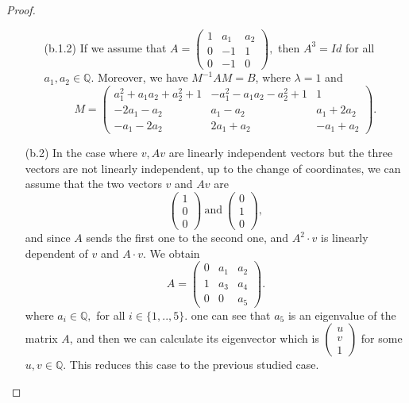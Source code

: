\documentclass[10pt,a4paper]{amsart}
\newcommand{\Q}{\ensuremath{\mathbb{Q} }}
\begin{document}
\begin{proof}
\begin{itemize}
\begin{itemize}
\item [(b.1.2)] If we assume that
$A=\left(\begin{array}{ccc}
1 & a_{1} & a_{2} 
\\
 0 & -1 & 1 
\\
 0 & -1 & 0 
\end{array}\right)
,$ then $A^3=Id$ for all $a_{1},a_{2}\in\Q $. Moreover, we have $M^{-1}AM=B$, where $\lambda=1$ and 
\[M=\left(\begin{array}{ccc}
a_{1}^{2}+a_{1} a_{2}+a_{2}^{2}+1 & -a_{1}^{2}-a_{1} a_{2}-a_{2}^{2}+1 & 1 
\\
 -2 a_{1}-a_{2} & a_{1}-a_{2} & a_{1}+2 a_{2} 
\\
 -a_{1}-2 a_{2} & 2 a_{1}+a_{2} & -a_{1}+a_{2}
\end{array}\right).\]

    \end{itemize}
   \item [(b.2)] In the case where $v, Av$ are linearly independent vectors but the three vectors are not linearly independent, up to the change of coordinates, we can assume that the two vectors $v$ and $Av$ are 
   \[\left(\begin{array}{c}
                 1\\
                 0\\0 
            \end{array}\right)~\mathrm{and}~\left(\begin{array}{c}
                 0\\
                 1\\0 
            \end{array}\right),\] and since $A$ sends the first one to the second one, and $A^2\cdot v$ is linearly dependent of $v$ and $A\cdot v$. We obtain 
\[
A=\left(
  \begin{array}{ccc}
0 & a_{1} & a_{2} 
\\
 1 & a_{3} & a_{4} 
\\
 0 & 0 & a_{5} 
\end{array}\right).
\]
where $a_i\in\Q ,$ for all $i\in\{1,..,5\}$. one can see that $a_5$ is an eigenvalue of the matrix $A$, and then we can calculate its eigenvector which is $\left(\begin{array}{c}
                 u\\
                 v\\1 
            \end{array}\right)$ for some $u,v\in\Q $. This reduces this case to the previous studied case.
\end{itemize}
\end{proof}
\end{document}
